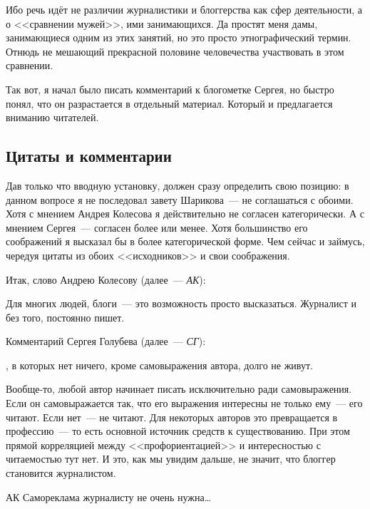 Ибо речь идёт не различии журналистики и блоггерства как сфер деятельности, а о <<сравнении мужей>>, ими занимающихся. Да простят меня дамы, занимающиеся одним из этих занятий, но это просто этнографический термин. Отнюдь не мешающий прекрасной половине человечества участвовать в этом сравнении.

Так вот, я начал было писать комментарий к блогометке Сергея, но быстро понял, что он разрастается в отдельный материал. Который и предлагается вниманию читателей.

\subsection{Цитаты и комментарии}
Дав только что вводную установку, должен сразу определить свою позицию: в данном вопросе я не последовал завету Шарикова~--- не соглашаться с обоими. Хотя с мнением Андрея Колесова я действительно не согласен категорически. А с мнением Сергея~--- согласен более или менее. Хотя большинство его соображений я высказал бы в более категорической форме. Чем сейчас и займусь, чередуя цитаты из обоих <<исходников>> и свои соображения.

Итак, слово Андрею Колесову (далее~--- \textit{АК}):


\begin{shadequote}{}Для многих людей, блоги~--- это возможность просто высказаться. Журналист и без того, постоянно пишет.\end{shadequote}

Комментарий Сергея Голубева (далее~--- \textit{СГ}):


\begin{shadequote}{}, в которых нет ничего, кроме самовыражения автора, долго не живут.
\end{shadequote}

Вообще-то, любой автор начинает писать исключительно ради самовыражения. Если он самовыражается так, что его выражения интересны не только ему~--- его читают. Если нет~--- не читают. Для некоторых авторов это превращается в профессию~--- то есть основной источник средств к существованию. При этом прямой корреляцией между <<профориентацией>> и интересностью с читаемостью тут нет. И это, как мы увидим дальше, не значит, что блоггер становится журналистом.


\begin{shadequote}[r]{АК}
Самореклама журналисту не очень нужна\dots
\end{shadequote}


